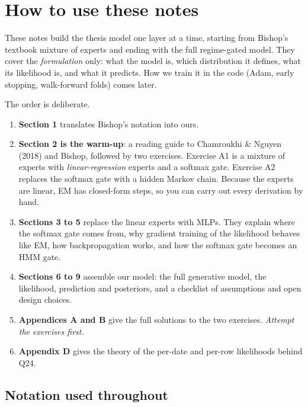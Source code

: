 \section*{How to use these notes}

These notes build the thesis model one layer at a time, starting from Bishop's textbook mixture of experts and ending with the full regime-gated model. They cover the \emph{formulation} only: what the model is, which distribution it defines, what its likelihood is, and what it predicts. How we train it in the code (Adam, early stopping, walk-forward folds) comes later.

The order is deliberate.
\begin{enumerate}
  \item \textbf{Section 1} translates Bishop's notation into ours.
  \item \textbf{Section 2 is the warm-up}: a reading guide to Chamroukhi \& Nguyen (2018) and Bishop, followed by two exercises. Exercise A1 is a mixture of experts with \emph{linear-regression} experts and a softmax gate. Exercise A2 replaces the softmax gate with a hidden Markov chain. Because the experts are linear, EM has closed-form steps, so you can carry out every derivation by hand.
  \item \textbf{Sections 3 to 5} replace the linear experts with MLPs. They explain where the softmax gate comes from, why gradient training of the likelihood behaves like EM, how backpropagation works, and how the softmax gate becomes an HMM gate.
  \item \textbf{Sections 6 to 9} assemble our model: the full generative model, the likelihood, prediction and posteriors, and a checklist of assumptions and open design choices.
  \item \textbf{Appendices A and B} give the full solutions to the two exercises. \emph{Attempt the exercises first.}
  \item \textbf{Appendix D} gives the theory of the per-date and per-row likelihoods behind Q24.
\end{enumerate}

\subsection*{Notation used throughout}

